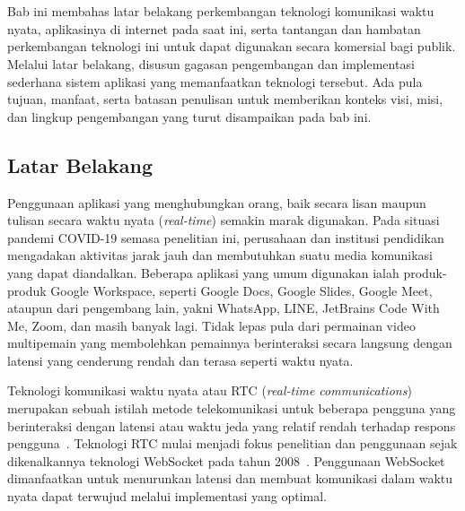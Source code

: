 \chapter{\babSatu}
\label{bab:1}
Bab ini membahas latar belakang perkembangan teknologi komunikasi waktu nyata, aplikasinya di internet pada saat ini, serta tantangan dan hambatan perkembangan teknologi ini untuk dapat digunakan secara komersial bagi publik. Melalui latar belakang, disusun gagasan pengembangan dan implementasi sederhana sistem aplikasi yang memanfaatkan teknologi tersebut. Ada pula tujuan, manfaat, serta batasan penulisan untuk memberikan konteks visi, misi, dan lingkup pengembangan yang turut disampaikan pada bab ini.



\section{Latar Belakang}
\label{sec:latarBelakang}
Penggunaan aplikasi yang menghubungkan orang, baik secara lisan maupun tulisan secara waktu nyata (\textit{real-time}) semakin marak digunakan. Pada situasi pandemi COVID-19 semasa penelitian ini, perusahaan dan institusi pendidikan mengadakan aktivitas jarak jauh dan membutuhkan suatu media komunikasi yang dapat diandalkan. Beberapa aplikasi yang umum digunakan ialah produk-produk Google Workspace, seperti Google Docs, Google Slides, Google Meet, ataupun dari pengembang lain, yakni WhatsApp, LINE, JetBrains Code With Me, Zoom, dan masih banyak lagi. Tidak lepas pula dari permainan video multipemain yang membolehkan pemainnya berinteraksi secara langsung dengan latensi yang cenderung rendah dan terasa seperti waktu nyata.

Teknologi komunikasi waktu nyata atau RTC (\textit{real-time communications}) merupakan sebuah istilah metode telekomunikasi untuk beberapa pengguna yang berinteraksi dengan latensi atau waktu jeda yang relatif rendah terhadap respons pengguna~\citep{arefin2013modified}. Teknologi RTC mulai menjadi fokus penelitian dan penggunaan sejak dikenalkannya teknologi WebSocket pada tahun 2008~\citep{fette2011websocket, reynolds2008web}. Penggunaan WebSocket dimanfaatkan untuk menurunkan latensi dan membuat komunikasi dalam waktu nyata dapat terwujud melalui implementasi yang optimal.

